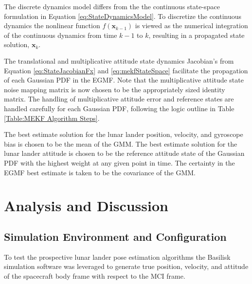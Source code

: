 \documentclass[conf]{new-aiaa}
\newcommand{\vect}[1]{\mathbf{#1}}
\begin{document}
The discrete dynamics model differs from the the continuous state-space formulation in Equation \ref{eq:StateDynamicsModel}. To discretize the continuous dynamics the nonlinear function $f(\vect{x}_{k-1})$ is viewed as the numerical integration of the continuous dynamics from time $k-1$ to $k$, resulting in a propagated state solution, $\vect{x}_{k}$.

The translational and multiplicative attitude state dynamics Jacobian's from Equation \ref{eq:StateJacobianFx} and \ref{eq:mekfStateSpace} facilitate the propagation of each Gaussian PDF in the EGMF. Note that the multiplicative attitude state noise mapping matrix is now chosen to be the appropriately sized identity matrix. The handling of multiplicative attitude error and reference states are handled carefully for each Gaussian PDF, following the logic outline in Table \ref{Table:MEKF Algorithm Steps}.

The best estimate solution for the lunar lander position, velocity, and gyroscope bias is chosen to be the mean of the GMM. The best estimate solution for the lunar lander attitude is chosen to be the reference attitude state of the Gaussian PDF with the highest weight at any given point in time. The certainty in the EGMF best estimate is taken to be the covariance of the GMM.



\section{Analysis and Discussion}
\subsection{Simulation Environment and Configuration}
To test the prospective lunar lander pose estimation algorithms the Basilisk simulation software was leveraged to generate true position, velocity, and attitude of the spacecraft body frame with respect to the MCI frame. 
\end{document}
